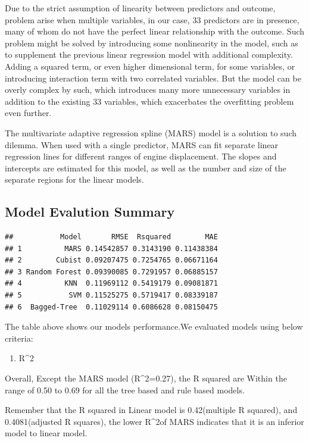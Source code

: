 \documentclass[]{article}
\providecommand{\tightlist}{%
  \setlength{\itemsep}{0pt}\setlength{\parskip}{0pt}}
\begin{document}
Due to the strict assumption of linearity between predictors and
outcome, problem arise when multiple variables, in our case, 33
predictors are in presence, many of whom do not have the perfect linear
relationship with the outcome. Such problem might be solved by
introducing some nonlinearity in the model, such as to supplement the
previous linear regression model with additional complexity. Adding a
squared term, or even higher dimensional term, for some variables, or
introducing interaction term with two correlated variables. But the
model can be overly complex by such, which introduces many more
unnecessary variables in addition to the existing 33 variables, which
exacerbates the overfitting problem even further.

The multivariate adaptive regression spline (MARS) model is a solution
to such dilemma. When used with a single predictor, MARS can fit
separate linear regression lines for different ranges of engine
displacement. The slopes and intercepts are estimated for this model, as
well as the number and size of the separate regions for the linear
models.

\subsection{Model Evalution Summary}\label{model-evalution-summary}

\begin{verbatim}
##           Model       RMSE  Rsquared        MAE
## 1          MARS 0.14542857 0.3143190 0.11438384
## 2        Cubist 0.09207475 0.7254765 0.06671164
## 3 Random Forest 0.09390085 0.7291957 0.06885157
## 4          KNN  0.11969112 0.5419179 0.09081871
## 5           SVM 0.11525275 0.5719417 0.08339187
## 6  Bagged-Tree  0.11029114 0.6086628 0.08150475
\end{verbatim}

The table above shows our models performance.We evaluated models using
below criteria:

\begin{enumerate}
\def\labelenumi{\arabic{enumi}.}
\tightlist
\item
  R\^{}2
\end{enumerate}

Overall, Except the MARS model (R\^{}2=0.27), the R squared are Within
the range of 0.50 to 0.69 for all the tree based and rule based models.

Remember that the R squared in Linear model is 0.42(multiple R squared),
and 0.4081(adjusted R squares), the lower R\^{}2of MARS indicates that
it is an inferior model to linear model.
\end{document}
